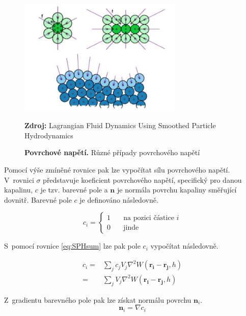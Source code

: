\begin{figure}[hbt]
	\centering
	\captionsetup{justification=centering}
	\includegraphics[width=0.7\textwidth]{obrazky-figures/SurfTens.png}
	\caption{\textbf{Povrchové napětí.} Různé případy povrchového napětí}
	\textbf{Zdroj: } Lagrangian Fluid Dynamics Using Smoothed Particle Hydrodynamics \cite{KelagerSPH}
	\label{fig:SurTen}
\end{figure}

Pomocí výše zmíněné rovnice pak lze vypočítat sílu povrchového napětí. V~rovnici $\sigma$ představuje koeficient povrchového napětí, specifický pro danou kapalinu, $c$ je tzv. barevné pole a $\mathbf{n}$ je normála povrchu kapaliny směřující dovnitř. Barevné pole $c$ je definováno následovně.

\begin{equation}
    c_i = 
    \begin{cases}
     1 & \quad  \text{na pozici částice } i \\
     0 & \quad  \text{jinde}
    \end{cases}
\end{equation}

S~pomocí rovnice \ref{eq:SPHsum} lze pak pole $c_i$ vypočítat následovně.

\begin{equation}
    \begin{split}
        c_i =   & \sum_j c_j V_j \nabla^2 W(\mathbf{r_i} - \mathbf{r_j},h) \\
            =   & \sum_j V_j \nabla^2 W(\mathbf{r_i} - \mathbf{r_j},h)
    \end{split}
    \label{eq:ColorField}
\end{equation}

Z~gradientu barevného pole pak lze získat normálu povrchu $\mathbf{n}_i$.
\begin{equation}
    \mathbf{n}_i = \nabla c_i
    \label{eq:SurfNormal}
\end{equation}

